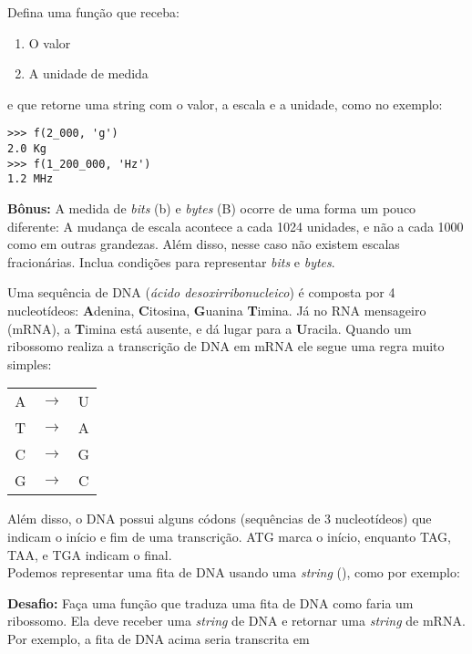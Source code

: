 \documentclass[12pt]{article}
\begin{document}
	\quest Defina uma função que receba:
	\begin{enumerate}
		\item O valor
		\item A unidade de medida
	\end{enumerate}
	e que retorne uma string com o valor, a escala e a unidade, como no exemplo:
	
	\begin{lstlisting}
>>> f(2_000, 'g')
2.0 Kg
>>> f(1_200_000, 'Hz')
1.2 MHz 
	\end{lstlisting}

	\textbf{Bônus:} A medida de \textit{bits} (b) e \textit{bytes} (B) ocorre de uma forma um pouco diferente: A mudança de escala acontece a cada 1024 unidades, e não a cada 1000 como em outras grandezas. Além disso, nesse caso não existem escalas fracionárias. Inclua condições para representar \textit{bits} e \textit{bytes}.
	
	
	
	Uma sequência de DNA (\emph{ácido desoxirribonucleico}) é composta por 4 nucleotídeos: \textbf{A}denina, \textbf{C}itosina, \textbf{G}uanina \textbf{T}imina. Já no RNA mensageiro (mRNA), a \textbf{T}imina está ausente, e dá lugar para a \textbf{U}racila. Quando um ribossomo realiza a transcrição de DNA em mRNA ele segue uma regra muito simples:
		
	\begin{center}
			\begin{tabular}{ccc}
				A & $\rightarrow$ & U\\
				T & $\rightarrow$ & A\\
				C & $\rightarrow$ & G\\
				G & $\rightarrow$ & C\\
			\end{tabular}
	\end{center}
	
	Além disso, o DNA possui alguns códons (sequências de 3 nucleotídeos) que indicam o início e fim de uma transcrição. ATG marca o início, enquanto TAG, TAA, e TGA indicam o final.\\
	
	Podemos representar uma fita de DNA usando uma \emph{string} (), como por exemplo:
	\begin{center}
	\end{center}
	
	\textbf{Desafio:} Faça uma função que traduza uma fita de DNA como faria um ribossomo. Ela deve receber uma \textit{string} de DNA e retornar uma \textit{string} de mRNA. Por exemplo, a fita de DNA acima seria transcrita em
	\begin{center}
	\end{center}
	
\end{document}
